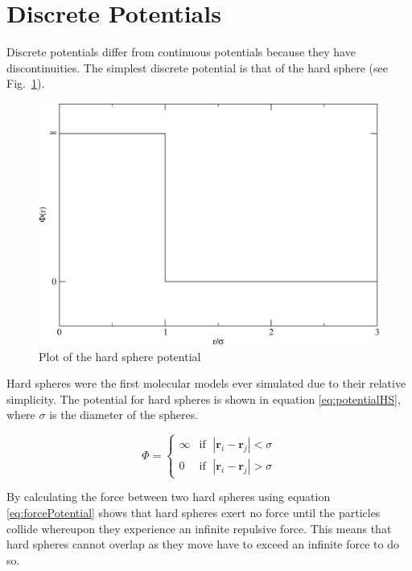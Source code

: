 \documentclass[12pt]{UoAthesis}
\begin{document}
\section{Discrete Potentials}

Discrete potentials differ from continuous potentials because they
have discontinuities.  The simplest discrete potential is that of the
hard sphere (see Fig.~\ref{fig:hardSphere}).

\begin{figure}[htp] 
  \begin{center}
    \includegraphics[clip,scale = 0.45]{figures/hardSphere} 
    \caption{\label{fig:hardSphere} Plot of the hard sphere potential}
  \end{center}
\end{figure}

Hard spheres were the first molecular models ever simulated
\cite{Alder1957} due to their relative simplicity.  The potential for
hard spheres is shown in equation \eqref{eq:potentialHS}, where
$\sigma$ is the diameter of the spheres.

\begin{equation}
  \label{eq:potentialHS}
  \Phi = 
  \begin{cases}
    \infty &\text{if }\; |\mathbf{r}_i - \mathbf{r}_j| < \sigma \\
    0 &\text{if }\; |\mathbf{r}_i - \mathbf{r}_j| > \sigma
  \end{cases}
\end{equation}

By calculating the force between two hard spheres using equation
\eqref{eq:forcePotential} shows that hard spheres exert no force until
the particles collide whereupon they experience an infinite repulsive
force.  This means that hard spheres cannot overlap as they move have
to exceed an infinite force to do so.
\end{document}
